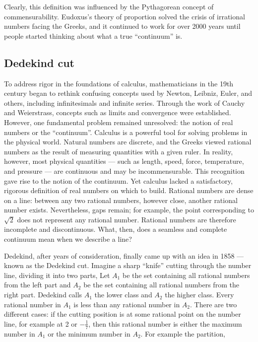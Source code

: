 \documentclass[b5paper]{article}
\begin{document}
Clearly, this definition was influenced by the Pythagorean concept of commensurability. Eudoxus's theory of proportion solved the crisis of irrational numbers facing the Greeks, and it continued to work for over 2000 years until people started thinking about what a true \enquote{continuum} is.

\subsection{Dedekind cut}

To address rigor in the foundations of calculus, mathematicians in the 19th century began to rethink confusing concepts used by Newton, Leibniz, Euler, and others, including infinitesimals and infinite series. Through the work of Cauchy and Weierstrass, concepts such as limits and convergence were established. However, one fundamental problem remained unresolved: the notion of real numbers or the \enquote{continuum}. Calculus is a powerful tool for solving problems in the physical world. Natural numbers are discrete, and the Greeks viewed rational numbers as the result of measuring quantities with a given ruler. In reality, however, most physical quantities — such as length, speed, force, temperature, and pressure — are continuous and may be incommensurable. This recognition gave rise to the notion of the continuum. Yet calculus lacked a satisfactory, rigorous definition of real numbers on which to build. Rational numbers are dense on a line: between any two rational numbers, however close, another rational number exists. Nevertheless, gaps remain; for example, the point corresponding to $\sqrt{2}$ does not represent any rational number. Rational numbers are therefore incomplete and discontinuous. What, then, does a seamless and complete continuum mean when we describe a line?

Dedekind, after years of consideration, finally came up with an idea in 1858 — known as the Dedekind cut. Imagine a sharp \enquote{knife} cutting through the number line, dividing it into two parts, Let $A_1$ be the set containing all rational numbers from the left part and $A_2$ be the set containing all rational numbers from the right part. Dedekind calls $A_1$ the lower class and $A_2$ the higher class. Every rational number in $A_1$ is less than any rational number in $A_2$. There are two different cases: if the cutting position is at some rational point on the number line, for example at 2 or $-\frac{1}{7}$, then this rational number is either the maximum number in $A_1$ or the minimum number in $A_2$. For example the partition,
\end{document}

